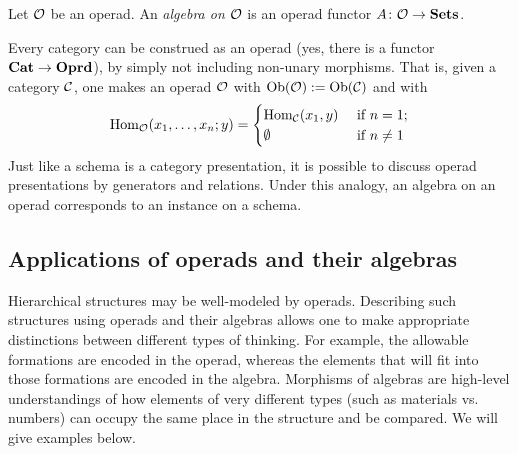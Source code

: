 \begin{definition}\label{def:operad algebra}

Let $\mathcal{O}$ be an operad. An {\em algebra on $\mathcal{O}$} is an operad functor $A\colon\mathcal{O}\rightarrow{\bf Sets}$.

\end{definition}

\begin{remark}

Every category can be construed as an operad (yes, there is a functor ${\bf Cat}\rightarrow{\bf Oprd}$), by simply not including non-unary morphisms. That is, given a category $\mathcal{C}$, one makes an operad $\mathcal{O}$ with $\textnormal{Ob}(\mathcal{O}):=\textnormal{Ob}(\mathcal{C})$ and with 
$$
\textnormal{Hom}_\mathcal{O}(x_1,\ldots,x_n;y)=
\begin{cases}
\textnormal{Hom}_\mathcal{C}(x_1,y)&\textnormal{ if }n=1;\\
\emptyset&\textnormal{ if }n\neq 1
\end{cases}
$$
Just like a schema is a category presentation, it is possible to discuss operad presentations by generators and relations. Under this analogy, an algebra on an operad corresponds to an instance on a schema.

\end{remark}


\subsection{Applications of operads and their algebras}

Hierarchical structures may be well-modeled by operads. Describing such structures using operads and their algebras allows one to make appropriate distinctions between different types of thinking. For example, the allowable formations are encoded in the operad, whereas the elements that will fit into those formations are encoded in the algebra. Morphisms of algebras are high-level understandings of how elements of very different types (such as materials vs. numbers) can occupy the same place in the structure and be compared. We will give examples below.

